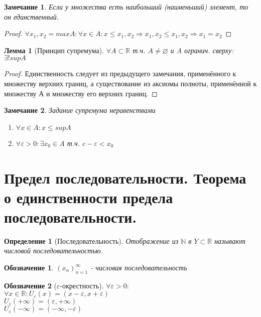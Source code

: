 \documentclass[12pt, a4]{article}
\newtheorem*{definition}{Определение}
\newtheorem*{notation}{Обозначение}
\newtheorem*{remark}{Замечание}
\newtheorem*{lemma}{Лемма}
\renewcommand{\implies}{\Rightarrow}
\renewcommand{\emptyset}{\varnothing}
\renewcommand{\epsilon}{\varepsilon}
\newcommand{\R}{\mathbb{R}}
\newcommand{\N}{\mathbb{N}}
\begin{document}
\begin{remark}
Если у множества есть наибольший (наименьший) элемент, то он единственный.
\end{remark}

\begin{proof}
$\forall x_1, x_2 = maxA: \forall x \in A: x \leq x_1, x_2 \implies x_1, x_2 \leq x_1, x_2 \implies x_1 = x_2$
\end{proof}

\begin{lemma}[Принцип супремума]
$\forall A \subset \R$ т.ч. $A \neq \emptyset$ и A огранич. сверху: $\exists!supA$
\end{lemma}

\begin{proof}
Единственность следует из предыдущего замечания, применённого к множеству верхних границ, а существование из аксиомы полноты, применённой к множеству А и множеству его верхних границ.
\end{proof}

\begin{remark} Задание супремума неравенствами
\begin{enumerate}
    \item $\forall x \in A: x \leq supA$
    \item $\forall \epsilon > 0: \exists x_0 \in A$ т.ч. $c - \epsilon < x_0$
\end{enumerate}
\end{remark}

\section{Предел последовательности. Теорема о единственности предела последовательности.}

\begin{definition}[Последовательность]
Отображение из $\N$ в $Y \subset \R$ называют числовой последовательностью.
\end{definition}

\begin{notation}
 $(x_n)_{n=1}^\infty$ - числовая последовательность
\end{notation}

\begin{notation}[$\epsilon$-окрестность]$\forall \epsilon > 0:$\\
$\forall x \in \R: U_\epsilon(x) = (x-\epsilon, x+\epsilon)$\\
$U_\epsilon(+\infty) = (\epsilon, +\infty)$\\
$U_\epsilon(-\infty) = (-\infty, -\epsilon)$\\
\end{notation}
\end{document}
